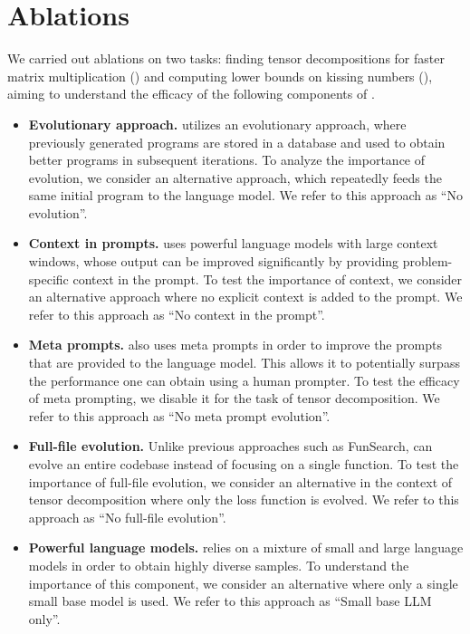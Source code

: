\section{Ablations}
\label{sec:ablations_rewrite}

We carried out ablations on two tasks: finding tensor decompositions for faster matrix multiplication () and computing lower bounds on kissing numbers (), aiming to understand the efficacy of the following components of \method.

\begin{itemize}
    \item {\bf Evolutionary approach.} \method utilizes an evolutionary approach, where previously generated programs are stored in a database and used to obtain better programs in subsequent iterations. To analyze the importance of evolution, we consider an alternative approach, which repeatedly feeds the same initial program to the language model. We refer to this approach as ``No evolution''.
    \item {\bf Context in prompts.} \method uses powerful language models with large context windows, whose output can be improved significantly by providing problem-specific context in the prompt. To test the importance of context, we consider an alternative approach where no explicit context is added to the prompt. We refer to this approach as ``No context in the prompt''.
    \item {\bf Meta prompts.} \method also uses meta prompts in order to improve the prompts that are provided to the language model. This allows it to potentially surpass the performance one can obtain using a human prompter. To test the efficacy of meta prompting, we disable it for the task of tensor decomposition. We refer to this approach as ``No meta prompt evolution''.
    \item {\bf Full-file evolution.} Unlike previous approaches such as FunSearch, \method can evolve an entire codebase instead of focusing on a single function. To test the importance of full-file evolution, we consider an alternative in the context of tensor decomposition where only the loss function is evolved. We refer to this approach as ``No full-file evolution''.
    \item {\bf Powerful language models.} \method relies on a mixture of small and large language models in order to obtain highly diverse samples. To understand the importance of this component, we consider an alternative where only a single small base model is used. We refer to this approach as ``Small base LLM only''.
\end{itemize}

